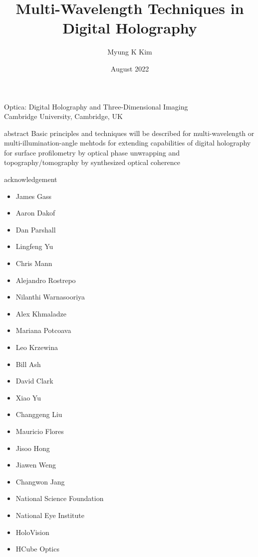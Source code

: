 \documentclass[t, aspectratio=169]{beamer}
\title{Multi-Wavelength Techniques in Digital Holography}
\author{Myung K Kim}
\institute{University of South Florida}
\date{August 2022}
\begin{document}
\begin{frame}
	Optica: Digital Holography and Three-Dimensional Imaging\\
	Cambridge University, Cambridge, UK
	\titlepage
\end{frame}


\begin{frame}{abstract}
	\vspace{10 mm}
	\centering
Basic principles and techniques will be described for multi-wavelength or multi-illumination-angle mehtods for extending capabilities of digital holography for surface profilometry by optical phase unwrapping and topography/tomography by synthesized optical coherence
\end{frame}


\begin{frame}{acknowledgement}
	\begin{multicols}{2}
		\begin{itemize}
			\item{James Gass}
			\item{Aaron Dakof}
			\item{Dan Parshall}
			\item{Lingfeng Yu}
			\item{Chris Mann}
			\item{Alejandro Rostrepo}
			\item{Nilanthi Warnasooriya}
			\item{Alex Khmaladze}
			\item{Mariana Potcoava}
			\item{Leo Krzewina}
			\item{Bill Ash}
			\item{David Clark}
			\item{Xiao Yu}
			\item{Changgeng Liu}
			\item{Mauricio Flores}
			\item{Jisoo Hong}
			\item{Jiawen Weng}
			\item{Changwon Jang}
			\vspace{5 mm}
			\item{National Science Foundation}
			\item{National Eye Institute}
			\item{HoloVision}
			\item{HCube Optics}
		\end{itemize}
	\end{multicols}
\end{frame}
\end{document}
